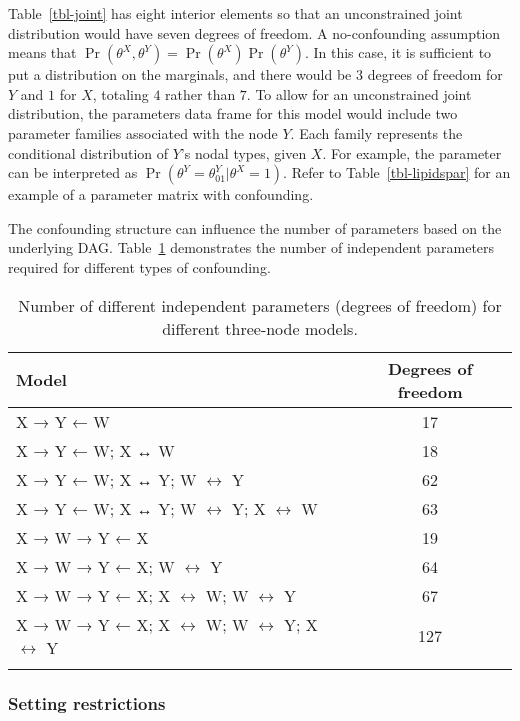 \documentclass[
  11pt,
  article]{jss}
\renewcommand{\texttt}[1]{\code{#1}}
\begin{document}
Table~\ref{tbl-joint} has eight interior elements so that an
unconstrained joint distribution would have seven degrees of freedom. A
no-confounding assumption means that
\(\Pr(\theta^X, \theta^Y) = \Pr(\theta^X)\Pr(\theta^Y)\). In this case,
it is sufficient to put a distribution on the marginals, and there would
be \(3\) degrees of freedom for \(Y\) and \(1\) for \(X\), totaling
\(4\) rather than \(7\). To allow for an unconstrained joint
distribution, the parameters data frame for this model would include two
parameter families associated with the node \(Y\). Each family
represents the conditional distribution of \(Y\)'s nodal types, given
\(X\). For example, the parameter \texttt{Y01\_X.1} can be interpreted
as \(\Pr(\theta^Y = \theta^Y_{01} | \theta^X=1)\). Refer to
Table~\ref{tbl-lipidspar} for an example of a parameter matrix with
confounding.

The confounding structure can influence the number of parameters based
on the underlying DAG. Table~\ref{tbl-dof} demonstrates the number of
independent parameters required for different types of confounding.

\begin{longtable}{lc}

\toprule
Model & Degrees of freedom\\
\midrule
X → Y ← W & 17\\
X → Y ← W; X ↔ W & 18\\
X → Y ← W; X ↔ Y; W $\leftrightarrow$ Y & 62\\
X → Y ← W; X ↔ Y; W $\leftrightarrow$ Y; X $\leftrightarrow$ W & 63\\
X → W → Y ← X & 19\\
X → W → Y ← X; W $\leftrightarrow$ Y & 64\\
X → W → Y ← X; X $\leftrightarrow$ W; W $\leftrightarrow$ Y & 67\\
X → W → Y ← X; X $\leftrightarrow$ W; W $\leftrightarrow$ Y; X $\leftrightarrow$ Y & 127\\
\bottomrule


\caption{\label{tbl-dof}Number of different independent parameters
(degrees of freedom) for different three-node models.}

\tabularnewline
\end{longtable}

\subsubsection{Setting restrictions}\label{restrictions}
\end{document}
